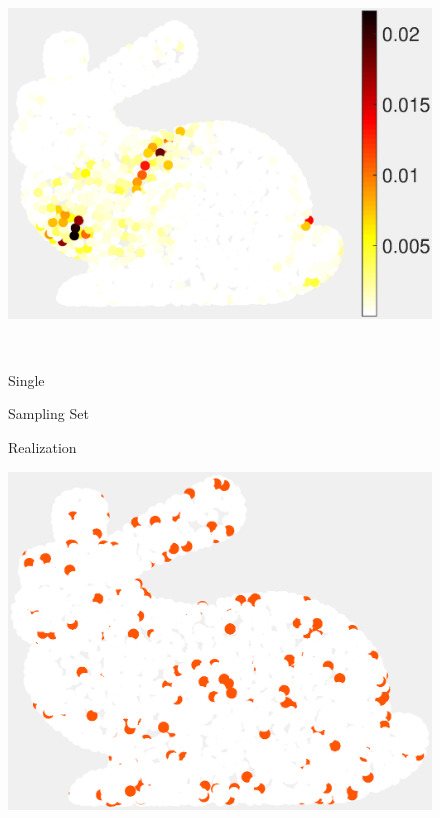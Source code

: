 \documentclass[journal, 10pt]{IEEEtran}
\begin{document}
\begin{figure}[H]
\begin{minipage}[m]{0.4\linewidth}
\end{minipage}
\begin{minipage}[m]{0.4\linewidth}
\centerline{\includegraphics[width=.85\linewidth]{fig_rec_band_weights_adapted}}
\end{minipage} \\
\begin{minipage}[m]{0.16\linewidth}
\centerline{\small{Single}}
\centerline{\small{Sampling Set}}
\centerline{\small{Realization}}
\end{minipage}
\begin{minipage}[m]{0.4\linewidth}
\centerline{\includegraphics[width=.85\linewidth]{fig_rec_low_selected}}
\end{minipage}
\begin{minipage}[m]{0.4\linewidth}

\end{minipage}
\end{figure}
\end{document}
